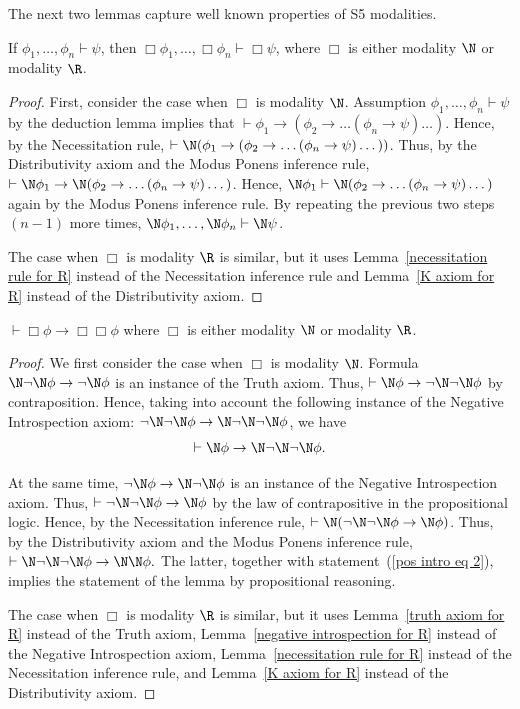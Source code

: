 \documentclass[letterpaper]{article}
\begin{document}
The next two lemmas capture well known properties of S5 modalities. %

\begin{lemma}\label{superdistributivity}
If $\phi_1,\dots,\phi_n\vdash \psi$, then $\Box\phi_1,\dots,\Box\phi_n\vdash \Box\psi$, where $\Box$ is either modality $\N$ or modality $\R$.
\end{lemma}
\begin{proof}
First, consider the case when $\Box$ is modality $\N$. Assumption $\phi_1,\dots,\phi_n\vdash \psi$ by the deduction lemma implies that
$\vdash\phi_1\to(\phi_2\to\dots(\phi_n\to \psi)\dots)$. Hence, by the Necessitation rule,
$\vdash\N(\phi_1\to(\phi_2\to\dots(\phi_n\to \psi)\dots))$.
Thus, by the Distributivity axiom and the Modus Ponens inference rule,
$\vdash\N\phi_1\to\N(\phi_2\to\dots(\phi_n\to \psi)\dots)$.
Hence,
$\N\phi_1\vdash\N(\phi_2\to\dots(\phi_n\to \psi)\dots)$
again by the Modus Ponens inference rule.
By repeating the previous two steps $(n-1)$ more times,
$\N\phi_1,\dots,\N\phi_n\vdash \N\psi$.

The case when $\Box$ is modality $\R$ is similar, but it uses Lemma~\ref{necessitation rule for R} instead of the Necessitation inference rule and Lemma~\ref{K axiom for R} instead of the Distributivity axiom.
\end{proof}


\begin{lemma}\label{positive introspection lemma}
$\vdash\Box\phi\to\Box\Box\phi$ where $\Box$ is either modality $\N$ or modality $\R$.
\end{lemma}
\begin{proof}
We first consider the case when $\Box$ is modality $\N$.
Formula $\N\neg\N\phi\to\neg\N\phi$ is an instance of the Truth axiom. Thus, $\vdash \N\phi\to\neg\N\neg\N\phi$ by contraposition. Hence, taking into account the following instance of  the Negative Introspection axiom: $\neg\N\neg\N\phi\to\N\neg\N\neg\N\phi$,
we have
\begin{equation}\label{pos intro eq 2}
\vdash \N\phi\to\N\neg\N\neg\N\phi.
\end{equation}

At the same time, $\neg\N\phi\to\N\neg\N\phi$ is an instance of the Negative Introspection axiom. Thus, $\vdash \neg\N\neg\N\phi\to \N\phi$ by the law of contrapositive in the propositional logic. Hence, by the Necessitation inference rule,
$\vdash \N(\neg\N\neg\N\phi\to \N\phi)$. Thus, by  the Distributivity axiom and the Modus Ponens inference rule,
$
  \vdash \N\neg\N\neg\N\phi\to \N\N\phi.
$
 The latter, together with statement~(\ref{pos intro eq 2}), implies the statement of the lemma by propositional reasoning.

The case when $\Box$ is modality $\R$ is similar, but it uses Lemma~\ref{truth axiom for R} instead of the Truth axiom, Lemma~\ref{negative introspection for R} instead of the Negative Introspection axiom, Lemma~\ref{necessitation rule for R} instead of the Necessitation inference rule, and Lemma~\ref{K axiom for R} instead of the Distributivity axiom.
\end{proof}
\end{document}

